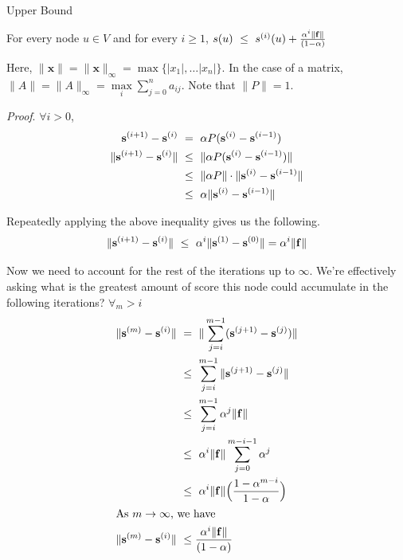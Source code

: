 \par{Upper Bound}

\begin{lemma}
For every node $u \in V$ and for every $i\geq 1$, $s(u) \ \le \ s^{(i)}(u) + \frac{\alpha^i\|\mathbf{f}\|}{(1-\alpha)}$
\end{lemma}

Here, $\|\mathbf{x}\| = \|\mathbf{x}\|_{\infty} = \max\{|x_1|, \ldots |x_n|\}$. 
In the case of a matrix, $\|A\| = \|A\|_{\infty} = \max\limits_{i}\sum\limits_{j=0}^{n}a_{ij}$. 
Note that $\|P\| = 1$.

\textit{Proof}. $\forall i > 0$, 
\begin{align}
\mathbf{s}^{(i+1)} - \mathbf{s}^{(i)} \     &=   \ \alpha{}P(\mathbf{s}^{(i)} - \mathbf{s}^{(i-1)}) \\
\|\mathbf{s}^{(i+1)} - \mathbf{s}^{(i)}\| \ &\le \ \|\alpha{}P(\mathbf{s}^{(i)} - \mathbf{s}^{(i-1)})\| \\
                          \ &\le \ \|\alpha{}P\| \cdot \|\mathbf{s}^{(i)} - \mathbf{s}^{(i-1)}\| \\
                          \ &\le \ \alpha{} \|\mathbf{s}^{(i)} - \mathbf{s}^{(i-1)}\|
\end{align}

Repeatedly applying the above inequality gives us the following. 
\begin{equation}
\|\svec{i+1} - \svec{i}\| \ \le \ \alpha^{i} \|\svec{1} - \svec{0}\| = \alpha^{i}\|\mathbf{f}\|
\end{equation}

Now we need to account for the rest of the iterations up to $\infty$. 
We're effectively asking what is the greatest amount of score this node could accumulate in the following iterations? $\forall_m > i$
\begin{align}
\|\svec{m} - \svec{i}\| \ 
&=   \ \| \sum_{j=i}^{m-1}(\svec{j+1} - \svec{j}) \| \\
&\le \ \sum_{j=i}^{m-1}\| \svec{j+1} - \svec{j} \| \\
&\le \ \sum_{j=i}^{m-1} \alpha^{j}\|\mathbf{f}\| \\
&\le \ \alpha^i\|\mathbf{f}\| \sum_{j=0}^{m-i-1} \alpha^{j} \\
&\le \ \alpha^i\|\mathbf{f}\| \Big( \frac{1 - \alpha^{m-i}}{1 - \alpha} \Big) \\
\intertext{As $m\to\infty$, we have} 
\|\svec{m} - \svec{i}\| \ &\le \frac{\alpha^i\|\mathbf{f}\|}{(1-\alpha)}
\end{align}


